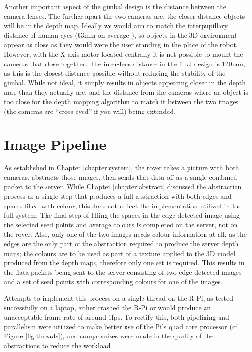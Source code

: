 Another important aspect of the gimbal design is the distance between the camera lenses. The further apart the two cameras are, the closer distance objects will be in the depth map. Ideally we would aim to match the interpupillary distance of human eyes (63mm on average \cite{dodgson2004variation}), so objects in the 3D environment appear as close as they would were the user standing in the place of the robot. However, with the X-axis motor located centrally it is not possible to mount the cameras that close together. The inter-lens distance in the final design is 120mm, as this is the closest distance possible without reducing the stability of the gimbal. While not ideal, it simply results in objects appearing closer in the depth map than they actually are, and the distance from the cameras where an object is too close for the depth mapping algorithm to match it between the two images (the cameras are ``cross-eyed'' if you will) being extended.

\section{Image Pipeline}
\label{Subsection:comms}

As established in Chapter \ref{chapter:system}, the rover takes a picture with both cameras, abstracts those images, then sends that data off as a single combined packet to the server. While Chapter \ref{chapter:abstract} discussed the abstraction process as a single step that produces a full abstraction with both edges and spaces filled with colour, this does not reflect the implementation utilized in the full system. The final step of filling the spaces in the edge detected image using the selected seed points and average colours is completed on the server, not on the rover. Also, only one of the two images needs colour information at all, as the edges are the only part of the abstraction required to produce the server depth maps; the colours are to be used as part of a texture applied to the 3D model produced from the depth maps, therefore only one set is required. This results in the data packets being sent to the server consisting of two edge detected images and a set of seed points with corresponding colours for one of the images.

Attempts to implement this process on a single thread on the R-Pi, as tested successfully on a laptop, either crashed the R-Pi or would produce an unacceptable frame rate of around 1fps. To rectify this, both pipelining and parallelism were utilized to make better use of the Pi's quad core processor (cf. Figure \ref{fig:threads}), and compromises were made in the quality of the abstractions to reduce the workload.


